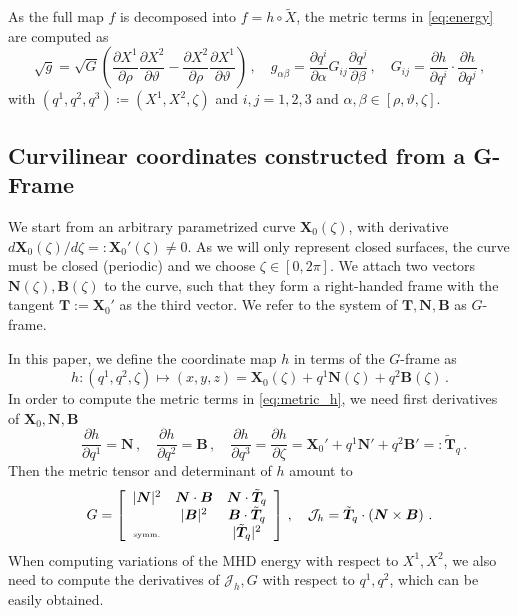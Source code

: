 \documentclass[12pt]{iopart}
\newcommand\hladdedrev[1]{#1} %
\newcommand\hlchangedrev[1]{#1} %
\newcommand\ddp[2]{\frac{\partial #1}{\partial #2}}
\newcommand\X{{\bm{X}}_0}
\newcommand\Xp{\X'}
\newcommand\Nnew{{\bm N}}
\newcommand\Bnew{{\bm B}}
\newcommand\hmap{{h}}
\newcommand\GFF{$G$-frame}
\newcommand\ttilde{{\tilde{\bm T}_q}}
\newcommand{\thet}{\vartheta}
\newcommand{\Jh}{\mathcal{J}_h}
\newcommand{\Jac}{\sqrt{g}}
\begin{document}
As the full map $f$ is decomposed into $f=h\circ \tilde{X}$, the metric terms in \eqref{eq:energy} are computed as
\begin{equation}
    \Jac=\sqrt{G}\left(\ddp{X^1}{\rho}\ddp{X^2}{\thet}-\ddp{X^2}{\rho}\ddp{X^1}{\thet}\right)\,,\quad g_{\alpha\beta}=\ddp{q^{i}}{\alpha}G_{ij}\ddp{q^{j}}{\beta}\,, \quad G_{ij}=\ddp{h}{q^i}\cdot\ddp{h}{q^j}\,, \label{eq:metric_h}
\end{equation}
with $(q^1,q^2,q^3)\coloneqq(X^1,X^2,\zeta)$ and $i,j=1,2,3$ and $\alpha, \beta \in [\rho,\thet,\zeta]$.

\subsection{\hlchangedrev{Curvilinear coordinates constructed from a G-Frame}}
\hladdedrev{We start from an arbitrary parametrized curve $\X(\zeta)$, \hladdedrev{with derivative $d\X(\zeta)/d\zeta =: \Xp(\zeta) \not= 0$}. As we will only represent closed surfaces, the curve must be closed (periodic) and we choose $\zeta\in[0,2\pi]$. We attach two vectors $\Nnew(\zeta),\Bnew(\zeta)$ to the curve, such that they form a right-handed frame with the tangent $\bm T:= \Xp$ as the third vector. We refer to the system of $\bm T,\Nnew,\Bnew$ as \GFF{}.}
\hlchangedrev{
In this paper, we define the coordinate map $h$ in terms of the \GFF{} as}
\begin{equation}
    \hmap: (q^1,q^2,\zeta) \mapsto (x,y,z)=\X(\zeta)+q^1\Nnew(\zeta)+q^2\Bnew(\zeta) \,. \label{eq:gff_h}
\end{equation}
In order to compute the metric terms in \eqref{eq:metric_h}, we need first derivatives of $\X,\Nnew,\Bnew$  
\begin{equation}
     \qquad \ddp{\hmap}{q^1}=\Nnew\,,\quad \ddp{\hmap}{q^2}=\Bnew\,,\quad \ddp{\hmap}{q^3}=\ddp{\hmap}{\zeta}=\X'+q^1 \Nnew' +q^2 \Bnew' =:\ttilde\,.
\end{equation}
Then the metric tensor and determinant of $\hmap$ amount to
\begin{equation}
    G =  \left[ {\begin{array}{ccc}
       |\Nnew|^2& \Nnew\cdot \Bnew & \Nnew\cdot \ttilde  \\
          &  |\Bnew|^2 & \Bnew\cdot \ttilde  \\ 
        \text{\tiny symm.} &     & |\ttilde|^2 \\
     \end{array} } \right]  \,,\quad \Jh = \ttilde \cdot \left(\Nnew \times \Bnew\right)  \,.\label{eq:metrics_h}
    \end{equation}
When computing variations of the MHD energy with respect to $X^1,X^2$, we also need to compute the derivatives of $\Jh,G$ with respect to $q^1,q^2$, \hlchangedrev{which can be easily obtained.}
\end{document}
